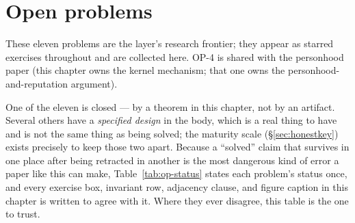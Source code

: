 \documentclass[11pt,a4paper]{article}
\theoremstyle{definition}
\theoremstyle{remark}
\begin{document}

\section{Open problems}
\label{sec:openproblems}

These eleven problems are the layer's research frontier; they appear as
starred exercises throughout and are collected here. OP-4 is shared with the
personhood paper (this chapter owns the kernel mechanism; that one owns the
personhood-and-reputation argument).

One of the eleven is closed --- by a theorem in this chapter, not by an artifact.
Several others have a \emph{specified design} in the body, which is a real thing to
have and is not the same thing as being solved; the maturity scale
(\S\ref{sec:honestkey}) exists precisely to keep those two apart. Because a
``solved'' claim that survives in one place after being retracted in another is the
most dangerous kind of error a paper like this can make,
Table~\ref{tab:op-status} states each problem's status once, and every exercise
box, invariant row, adjacency clause, and figure caption in this chapter is written
to agree with it. Where they ever disagree, this table is the one to trust.
\end{document}

